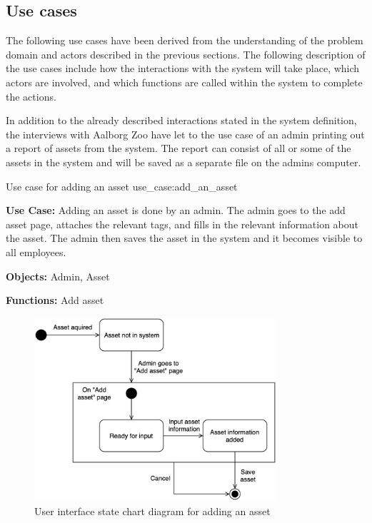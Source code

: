 \subsection{Use cases}\label{ssc:usecases}
The following use cases have been derived from the understanding of the problem domain and actors described in the previous sections. The following description of the use cases include how the interactions with the system will take place, which actors are involved, and which functions are called within the system to complete the actions.
\par
In addition to the already described interactions stated in the system definition, the interviews with Aalborg Zoo have let to the use case of an admin printing out a report of assets from the system. The report can consist of all or some of the assets in the system and will be saved as a separate file on the admins computer.
\newline

    {Use case for adding an asset}
    {use_case:add_an_asset}
    {
        \textbf{Use Case:} Adding an asset is done by an admin. The admin goes to the add asset page, attaches the relevant tags, and fills in the relevant information about the asset. The admin then saves the asset in the system and it becomes visible to all employees.
    
        \vskip 0.2cm
        
        \textbf{Objects:} Admin, Asset
        
        \vskip 0.2cm
        
        \textbf{Functions:} Add asset
    }

\begin{figure}[H]
    \centering
    \includegraphics[width=0.8\textwidth]{figures/UseCases/UC_Add_asset.png}
    \caption{User interface state chart diagram for adding an asset}
    \label{fig:add_asset_statechart}
\end{figure}

